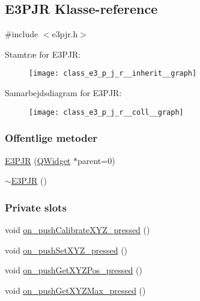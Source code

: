 \hypertarget{class_e3_p_j_r}{}\subsection{E3\+P\+JR Klasse-\/reference}
\label{class_e3_p_j_r}


{\ttfamily \#include $<$e3pjr.\+h$>$}



Stamtræ for E3\+P\+JR\+:
\nopagebreak
\begin{figure}[H]
\begin{center}
\leavevmode
\texttt{[image: class\_e3\_p\_j\_r\_\_inherit\_\_graph]}
\end{center}
\end{figure}


Samarbejdsdiagram for E3\+P\+JR\+:
\nopagebreak
\begin{figure}[H]
\begin{center}
\leavevmode
\texttt{[image: class\_e3\_p\_j\_r\_\_coll\_\_graph]}
\end{center}
\end{figure}
\subsubsection*{Offentlige metoder}
\begin{DoxyCompactItemize}
\item 
\hyperlink{class_e3_p_j_r_a3a52bafbf77585b77f7cdfd3d5a2ab56}{E3\+P\+JR} (\hyperlink{class_q_widget}{Q\+Widget} $\ast$parent=0)
\item 
\hyperlink{class_e3_p_j_r_aeb532350a6ae56c292c37a6b983dffa2}{$\sim$\+E3\+P\+JR} ()
\end{DoxyCompactItemize}
\subsubsection*{Private slots}
\begin{DoxyCompactItemize}
\item 
void \hyperlink{class_e3_p_j_r_a6be58dfeec35962cafa418d47ebffc72}{on\+\_\+push\+Calibrate\+X\+Y\+Z\+\_\+pressed} ()
\item 
void \hyperlink{class_e3_p_j_r_af5298acfab7b21baee2e8eb8dd495ddb}{on\+\_\+push\+Set\+X\+Y\+Z\+\_\+pressed} ()
\item 
void \hyperlink{class_e3_p_j_r_a1384ab1d803de29103a58660ec602240}{on\+\_\+push\+Get\+X\+Y\+Z\+Pos\+\_\+pressed} ()
\item 
void \hyperlink{class_e3_p_j_r_a0230271a4b635131924f64f1fa354345}{on\+\_\+push\+Get\+X\+Y\+Z\+Max\+\_\+pressed} ()
\end{DoxyCompactItemize}
